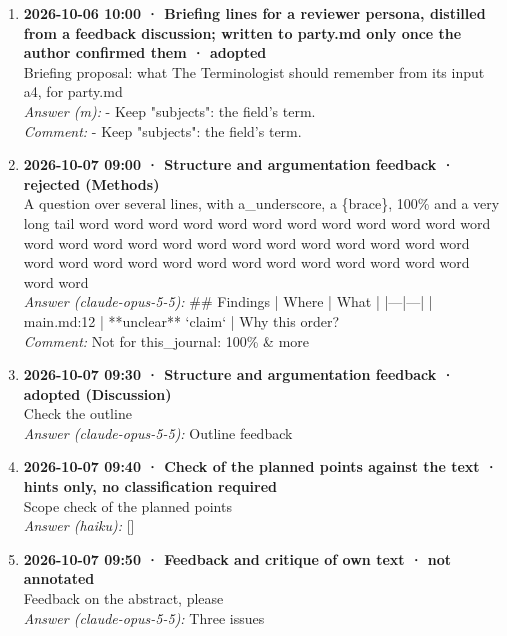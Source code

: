 \begin{enumerate}
  \\ \textit{Answer (m):} The Terminologist concedes for psychology.
  \item \textbf{2026-10-06 10:00 · Briefing lines for a reviewer persona, distilled from a feedback discussion; written to party.md only once the author confirmed them · adopted} \\
  Briefing proposal: what The Terminologist should remember from its input a4, for party.md
  \\ \textit{Answer (m):} - Keep "subjects": the field's term.
  \\ \textit{Comment:} - Keep "subjects": the field's term.
  \item \textbf{2026-10-07 09:00 · Structure and argumentation feedback · rejected (Methods)} \\
  A question over several lines, with a\_underscore, a \{brace\}, 100\% and a very long tail word word word word word word word word word word word word word word word word word word word word word word word word word word word word word word word word word word word word word word word word
  \\ \textit{Answer (claude-opus-5-5):} \#\# Findings | Where | What | |---|---| | main.md:12 | **unclear** `claim` | Why this order?
  \\ \textit{Comment:} Not for this\_journal: 100\% \& more
  \item \textbf{2026-10-07 09:30 · Structure and argumentation feedback · adopted (Discussion)} \\
  Check the outline
  \\ \textit{Answer (claude-opus-5-5):} Outline feedback
  \item \textbf{2026-10-07 09:40 · Check of the planned points against the text · hints only, no classification required} \\
  Scope check of the planned points
  \\ \textit{Answer (haiku):} []
  \item \textbf{2026-10-07 09:50 · Feedback and critique of own text · not annotated} \\
  Feedback on the abstract, please
  \\ \textit{Answer (claude-opus-5-5):} Three issues
\end{enumerate}
